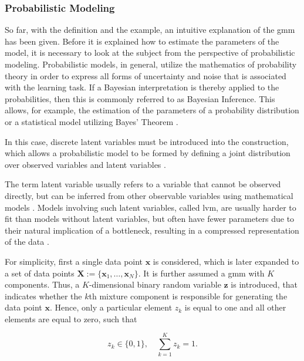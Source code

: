 
\subsubsection{Probabilistic Modeling}
So far, with the definition and the example, an intuitive explanation of the \acrshort{gmm} has been given. Before it is explained how to estimate the parameters of the model, it is necessary to look at the subject from the perspective of probabilistic modeling. Probabilistic models, in general, utilize the mathematics of probability theory in order to express all forms of uncertainty and noise that is associated with the learning task. If a Bayesian interpretation is thereby applied to the probabilities, then this is commonly referred to as Bayesian Inference. This allows, for example, the estimation of the parameters of a probability distribution or a statistical model utilizing Bayes' Theorem \cite[p.245]{dei_2020}. 

In this case, discrete latent variables must be introduced into the construction, which allows a probabilistic model to be formed by defining a joint distribution over observed variables and latent variables \cite[432]{bis_2006}. 

The term latent variable usually refers to a variable that cannot be observed directly, but can be inferred from other observable variables using mathematical models \cite{bor_2003}. Models involving such latent variables, called \acrshort{lvm}, are usually harder to fit than models without latent variables, but often have fewer parameters due to their natural implication of a bottleneck, resulting in a compressed representation of the data \cite[337]{mur_2012}. 

For simplicity, first a single data point $\bm{x}$ is considered, which is later expanded to a set of data points $\bm{X}:=\{\bm{x}_1, \dots, \bm{x}_N\}$. It is further assumed a \acrshort{gmm} with $K$ components. Thus, a $K$-dimensional binary random variable $\bm{z}$ is introduced, that indicates whether the $k$th mixture component is responsible for generating the data point $\bm{x}$. Hence, only a particular element $z_k$ is equal to one and all other elements are equal to zero, such that

\begin{equation}
    z_k \in \{0,1\}, \quad \sum\limits^K_{k=1} z_k=1.
\end{equation}

